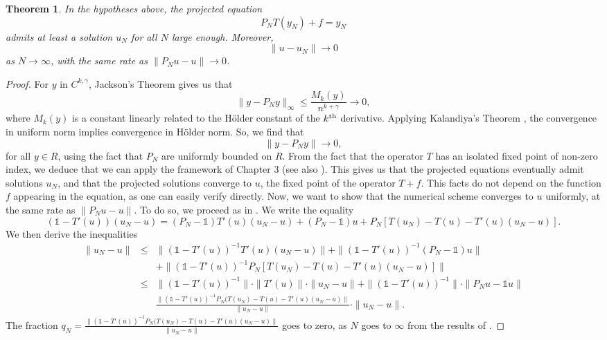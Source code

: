 \documentclass[11pt,fleqn]{amsart} %
\newtheorem{theorem}{Theorem}[section]
\begin{document}
	\begin{theorem}\label{thm:regular_T}
		In the hypotheses above, the projected equation 
		$$
		P_NT(y_N) + f = y_N
		$$
		admits at least a solution $u_N$ for all $N$ large enough. Moreover, 
		$$
		\|u - u_N\| \longrightarrow 0
		$$
		as $N \longrightarrow \infty$, with the same rate as $\|P_Nu - u\| \longrightarrow 0$. 
	\end{theorem}
	\begin{proof}
		For $y$ in $C^{k,\gamma}$, Jackson's Theorem gives us that 
		$$
		\|y - P_Ny\|_\infty \leq \frac{M_k(y)}{n^{k+\gamma}} \longrightarrow 0,
		$$
		where $M_k(y)$ is a constant linearly related to the H\"older constant of the $k^{\rm th}$ derivative. 
		Applying Kalandiya's Theorem \cite{Kal,Ioak}, the convergence in uniform norm implies convergence in H\"older norm. So, we find that
		$$
		\|y - P_Ny\| \longrightarrow 0,
		$$
		for all $y\in R$, using the fact that $P_N$ are uniformly bounded on $R$. 
		From the fact that the operator $T$ has an isolated fixed point of non-zero index, we deduce that we can apply the framework of \cite{Topological} Chapter 3 (see also \cite{Geometrical}). This gives us that the projected equations eventually admit solutions $u_N$, and that the projected solutions converge to $u$, the fixed point of the operator $T + f$. This facts do not depend on the function $f$ appearing in the equation, as one can easily verify directly. Now, we want to show that the numerical scheme converges to $u$ uniformly, at the same rate as $\|P_Nu - u\|$. To do so, we proceed as in \cite{Atk-Pot}. We write the equality 
		$$
		(\mathbb 1 - T'(u))(u_N - u) = (P_N-\mathbb 1)T'(u)(u_N-u) + (P_N - \mathbb 1)u + P_N[T(u_N) - T(u) - T'(u)(u_N-u)].
		$$
		We then derive the inequalities
		\begin{eqnarray*}
			\|u_N - u\| &\leq& \|(\mathbb 1 - T'(u))^{-1}T'(u)(u_N-u)\| + \|(\mathbb 1 - T'(u))^{-1}(P_N-\mathbb 1)u\| \\
			&& + \|(\mathbb 1 - T'(u))^{-1}P_N[T(u_N) - T(u) - T'(u)(u_N - u)]\|\\
			&\leq& \|(\mathbb 1 - T'(u))^{-1}\|\cdot \|T'(u)\|\cdot \|u_N - u\|+ \|(\mathbb 1 - T'(u))^{-1}\|\cdot \|P_N u - \mathbb 1 u\| \\
			&& \frac{\|(\mathbb 1 - T'(u))^{-1}P_N(T(u_N) - T(u) - T'(u)(u_N-u)\|}{\|u_N-u\|}\cdot \|u_N - u\|.
		\end{eqnarray*}
		The fraction $q_N = \frac{\|(\mathbb 1 - T'(u))^{-1}P_N(T(u_N) - T(u) - T'(u)(u_N-u)\|}{\|u_N-u\|}$ goes to zero, as $N$ goes to $\infty$ from the results of \cite{Topological,Geometrical}. 
		

\end{proof}
\end{document}
